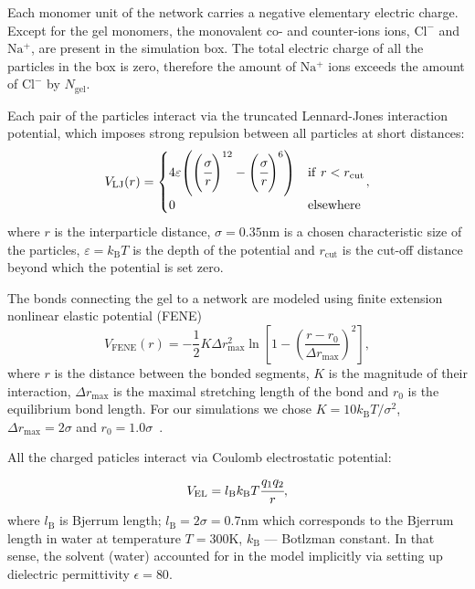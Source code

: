 \documentclass[journal,article,submit,pdftex,moreauthors]{Definitions/mdpi}
\newcommand{\kT}{k_\mathrm{B}T}
\newcommand{\kB}{k_\mathrm{B}}
\newcommand{\lb}{l_\mathrm{B}}
\newcommand{\cl}{\mathrm{Cl^-}}
\newcommand{\na}{\mathrm{Na^+}}
\newcommand{\Ngel}{N_\mathrm{gel}}
\begin{document}
Each monomer unit of the network carries a negative elementary electric charge.
Except for the gel monomers, the monovalent co- and counter-ions ions, $\cl$ and $\na$, are present in the simulation box.
The total electric charge of all the particles in the box is zero, therefore the amount of $\na$ ions exceeds the amount of $\cl$ by $\Ngel$.

Each pair of the particles interact via the truncated Lennard-Jones interaction potential, which imposes strong repulsion between all particles at short distances:
\begin{equation}
    \begin{split}\label{eq:LJ}
        V_\mathrm{LJ}(r) =
        \begin{cases}
            4 \varepsilon \left( \left(\cfrac{\sigma}{r}\right)^{12}
            - \left(\cfrac{\sigma}{r}\right)^6\right)
            & \mathrm{if~} r < r_\mathrm{cut}\\
            0
            & \mathrm{elsewhere}
        \end{cases},
    \end{split}
\end{equation}
where 
$r$ is the interparticle distance, 
$\sigma = 0.35 \mathrm{nm}$ is a chosen characteristic size of the particles, 
$\varepsilon = \kT$ is the depth of the potential and 
$r_\mathrm{cut}$ is the cut-off distance beyond which the potential is set zero.

The bonds connecting the gel to a network are modeled using finite extension nonlinear elastic potential (FENE)
\begin{equation}\label{eq:fene}
V_\mathrm{FENE}(r) = -\frac{1}{2} K \Delta r_\mathrm{max}^2\ln \left[ 1 - \left(\frac{r-r_0}{\Delta r_\mathrm{max}} \right)^2 \right ],
\end{equation}
where
$r$ is the distance between the bonded segments,
$K$ is the magnitude of their interaction,
$\Delta r_{\mathrm{max}}$ is the maximal stretching length of the bond and
$r_0$ is the equilibrium bond length.
For our simulations we chose $K = 10 \kT/\sigma^{2}$, $\Delta r_{\mathrm{max}} = 2 \sigma$ and $r_0 = 1.0\sigma$~\cite{Jin2007}.



All the charged paticles interact via Coulomb electrostatic potential:
\begin{equation}
    V_{\mathrm{EL}}=\lb\kT \cfrac{q_{1}q_{2}}{r},
\end{equation}
where $\lb$ is Bjerrum length; $\lb = 2\sigma = 0.7 \mathrm{nm}$ which corresponds to the  Bjerrum length in water at temperature $T=300 \mathrm{K}$, $\kB$ --- Botlzman constant.
In that sense, the solvent (water) accounted for in the model implicitly via setting up dielectric permittivity $\epsilon=80$.
\end{document}
